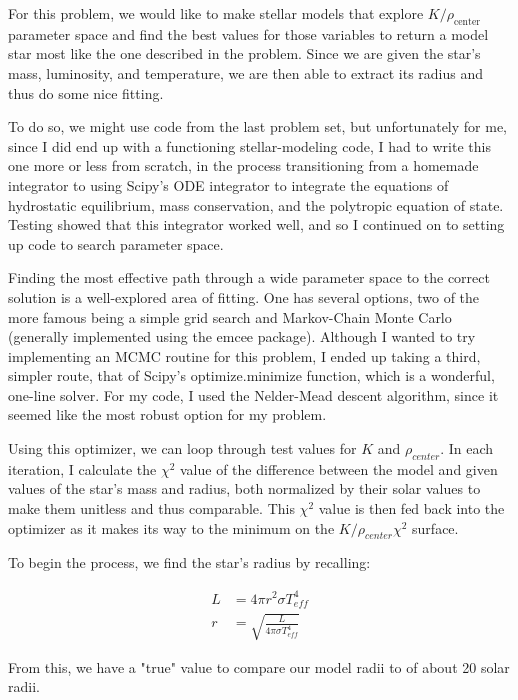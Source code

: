 \documentclass[12pt]{article}
\begin{document}
For this problem, we would like to make stellar models that explore $K/\rho_{\text{center}}$ parameter space and find the best values for those variables to return a model star most like the one described in the problem. Since we are given the star's mass, luminosity, and temperature, we are then able to extract its radius and thus do some nice fitting.

\bigskip
\bigskip

To do so, we might use code from the last problem set, but unfortunately for me, since I did end up with a functioning stellar-modeling code, I had to write this one more or less from scratch, in the process transitioning from a homemade integrator to using Scipy's ODE integrator to integrate the equations of hydrostatic equilibrium, mass conservation, and the polytropic equation of state. Testing showed that this integrator worked well, and so I continued on to setting up code to search parameter space.

\bigskip
\bigskip

Finding the most effective path through a wide parameter space to the correct solution is a well-explored area of fitting. One has several options, two of the more famous being a simple grid search and Markov-Chain Monte Carlo (generally implemented using the emcee package). Although I wanted to try implementing an MCMC routine for this problem, I ended up taking a third, simpler route, that of Scipy's optimize.minimize function, which is a wonderful, one-line solver. For my code, I used the Nelder-Mead descent algorithm, since it seemed like the most robust option for my problem.

\bigskip
\bigskip

Using this optimizer, we can loop through test values for $K$ and $\rho_{center}$. In each iteration, I calculate the $\chi^2$ value of the difference between the model and given values of the star's mass and radius, both normalized by their solar values to make them unitless and thus comparable. This $\chi^2$ value is then fed back into the optimizer as it makes its way to the minimum on the $K/\rho_{center} \chi^2$ surface.

To begin the process, we find the star's radius by recalling:

\begin{align}
  L &= 4 \pi r^2 \sigma T_{eff}^4 \\
  r &= \sqrt{\frac{L}{4 \pi \sigma T_{eff}^4}}
\end{align}

From this, we have a "true" value to compare our model radii to of about 20 solar radii.
\end{document}
